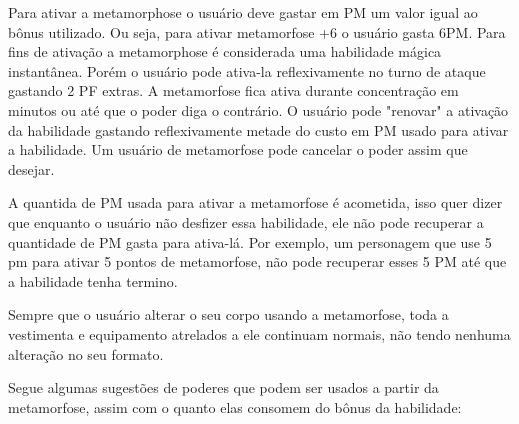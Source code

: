 Para ativar a metamorphose o usuário deve gastar em PM um valor igual ao bônus utilizado. Ou seja, para ativar metamorfose +6 o usuário gasta 6PM. Para fins de ativação a metamorphose é considerada uma habilidade mágica instantânea. Porém o usuário pode ativa-la reflexivamente no turno de ataque gastando 2 PF extras. A metamorfose fica ativa durante concentração em minutos ou até que o poder diga o contrário. O usuário pode "renovar" a ativação da habilidade gastando reflexivamente metade do custo em PM usado para ativar a habilidade. Um usuário de metamorfose pode cancelar o poder assim que desejar.


	

A quantida de PM usada para ativar a metamorfose é acometida, isso quer dizer que enquanto o usuário não desfizer essa habilidade, ele não pode recuperar a quantidade de PM gasta para ativa-lá. Por exemplo, um personagem que use 5 pm para ativar 5 pontos de metamorfose, não pode recuperar esses 5 PM até que a habilidade tenha termino.
	
	Sempre que o usuário alterar o seu corpo usando a metamorfose, toda a vestimenta e equipamento atrelados a ele continuam normais, não tendo nenhuma alteração no seu formato.

	Segue algumas sugestões de poderes que podem ser usados a partir da metamorfose, assim com o quanto elas consomem do bônus da habilidade:

